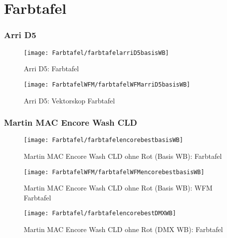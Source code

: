 \documentclass[pagesize,paper=A4,fontsize=12pt,utf8,numbers=noenddot,bibliography=totoc,listof=totoc,DIV=11,BCOR=1mm]{scrreprt}
\begin{document}
\section{Farbtafel}

\subsubsection{Arri D5}

\begin{figure}[htp]     %
\centering
\texttt{[image: Farbtafel/farbtafelarriD5basisWB]} 
\caption {Arri D5: Farbtafel} 
\end{figure}

\begin{figure}[htp]     %
\centering
\texttt{[image: FarbtafelWFM/farbtafelWFMarriD5basisWB]} 
\caption {Arri D5: Vektorskop Farbtafel} 
\end{figure}



\subsubsection{Martin MAC Encore Wash CLD}

\begin{figure}[htp]     %
\centering
\texttt{[image: Farbtafel/farbtafelencorebestbasisWB]} 
\caption {Martin MAC Encore Wash CLD ohne Rot (Basis WB): Farbtafel} 
\end{figure}

\begin{figure}[htp]     %
\centering
\texttt{[image: FarbtafelWFM/farbtafelWFMencorebestbasisWB]} 
\caption {Martin MAC Encore Wash CLD ohne Rot (Basis WB): WFM Farbtafel} 
\end{figure}

\begin{figure}[htp]     %
\centering
\texttt{[image: Farbtafel/farbtafelencorebestDMXWB]} 
\caption {Martin MAC Encore Wash CLD ohne Rot (DMX WB): Farbtafel} 
\end{figure}
\end{document}
